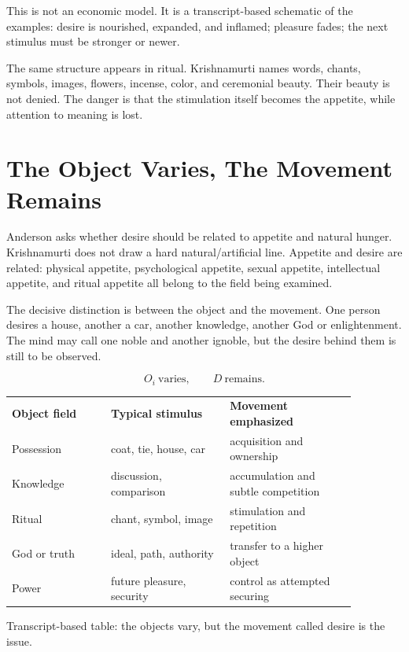 \documentclass[11pt,oneside]{book}
\begin{document}
This is not an economic model. It is a transcript-based schematic of the examples: desire is nourished, expanded, and inflamed; pleasure fades; the next stimulus must be stronger or newer.

The same structure appears in ritual. Krishnamurti names words, chants, symbols, images, flowers, incense, color, and ceremonial beauty. Their beauty is not denied. The danger is that the stimulation itself becomes the appetite, while attention to meaning is lost.

\section{The Object Varies, The Movement Remains}

Anderson asks whether desire should be related to appetite and natural hunger. Krishnamurti does not draw a hard natural/artificial line. Appetite and desire are related: physical appetite, psychological appetite, sexual appetite, intellectual appetite, and ritual appetite all belong to the field being examined.

The decisive distinction is between the object and the movement. One person desires a house, another a car, another knowledge, another God or enlightenment. The mind may call one noble and another ignoble, but the desire behind them is still to be observed.

\begin{equation}
O_i \ \text{varies},
\qquad
D \ \text{remains}.
\end{equation}

\begin{table}
\centering
\begin{tabular}{p{0.25\linewidth}p{0.30\linewidth}p{0.32\linewidth}}
\textbf{Object field} & \textbf{Typical stimulus} & \textbf{Movement emphasized}\\
Possession & coat, tie, house, car & acquisition and ownership\\
Knowledge & discussion, comparison & accumulation and subtle competition\\
Ritual & chant, symbol, image & stimulation and repetition\\
God or truth & ideal, path, authority & transfer to a higher object\\
Power & future pleasure, security & control as attempted securing
\end{tabular}

Transcript-based table: the objects vary, but the movement called desire is the issue.
\end{table}
\end{document}
